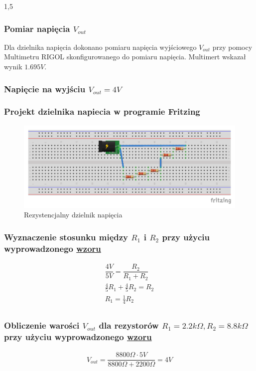 \documentclass[polish,polish,a4paper]{article}
\begin{document}
\begin{spacing}{1,5}
		\subsubsection*{Pomiar napięcia $ V_{out} $}
		Dla dzielnika napięcia dokonano pomiaru napięcia wyjściowego $ V_{out} $ przy pomocy Multimetru RIGOL skonfigurowanego do pomiaru napięcia. Multimert wskazał wynik $1.695V$.
		
		
		
		
		\subsubsection{Napięcie na wyjściu $V_{out} =  4V $}
		
		\subsubsection*{Projekt dzielnika napiecia w programie Fritzing}
		
		\begin{figure}[H]
			\centering
			\includegraphics[scale=0.9]{4_bb.pdf}
			\caption{Rezystencjalny dzielnik napięcia}
			\label{fig:pod4}
		\end{figure}
		
		\subsubsection*{Wyznaczenie stosunku między $ R_{1} $ i $ R_{2} $ przy użyciu wyprowadzonego \hyperref[eq:vout]{wzoru}}
		\begin{gather*}
		\dfrac{4V}{5V} = \dfrac{R_{2}}{R_{1} + R_{2}}\\
		\frac{4}{5} R_{1} + \frac{4}{5}R_{2} = R_{2}\\
		R_{1} =\frac{1}{4} R_{2}\\
		\end{gather*}
		\subsubsection*{Obliczenie warości $ V_{out}$ dla rezystorów $ R_{1} = 2.2k\Omega, R_{2} =8.8k\Omega  $  przy użyciu wyprowadzonego \hyperref[eq:vout]{wzoru}}
		\begin{gather*}
		V_{out} = \dfrac{8800\Omega \cdot 5V}{8800\Omega + 2200\Omega} = 4 V\\
		\end{gather*}

\end{spacing}
\end{document}
